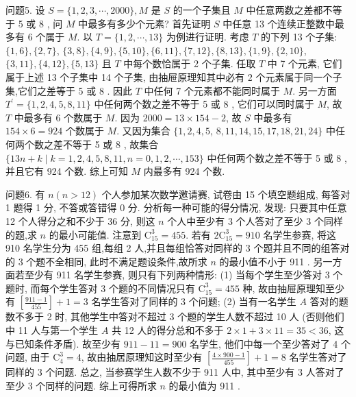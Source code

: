问题5. 设 $S=\{1,2,3, \cdots, 2000\}, M$ 是 $S$ 的一个子集且 $M$ 中任意两数之差都不等于 5 或 8 , 问 $M$ 中最多有多少个元素?
首先证明 $S$ 中任意 13 个连续正整数中最多有 6 个属于 $M$. 以 $T= \{1,2, \cdots, 13\}$ 为例进行证明.
考虑 $T$ 的下列 13 个子集: $\{1,6\},\{2,7\}$, $\{3,8\},\{4,9\},\{5,10\},\{6,11\},\{7,12\},\{8,13\},\{1,9\},\{2,10\}$, $\{3,11\},\{4,12\},\{5,13\}$ 且 $T$ 中每个数恰属于 2 个子集.
任取 $T$ 中 7 个元素, 它们属于上述 13 个子集中 14 个子集, 由抽屉原理知其中必有 2 个元素属于同一个子集,它们之差等于 5 或 8 . 因此 $T$ 中任何 7 个元素都不能同时属于 $M$. 另一方面 $T^{\prime}=\{1,2,4,5,8,11\}$ 中任何两个数之差不等于 5 或 8 , 它们可以同时属于 $M$, 故 $T$ 中最多有 6 个数属于 $M$. 因为 $2000=13 \times 154-2$, 故 $S$ 中最多有 $154 \times 6=924$ 个数属于 $M$. 又因为集合 $\{1,2,4,5$, $8,11,14,15,17,18,21,24\}$ 中任何两个数之差不等于 5 或 8 , 故集合 $\{13 n+k \mid k=1,2,4,5,8,11, n=0,1,2, \cdots, 153\}$ 中任何两个数之差不等于 5 或 8 ,并且它有 924 个数.
综上可知 $M$ 内最多有 924 个数.



问题6. 有 $n(n>12)$ 个人参加某次数学邀请赛, 试卷由 15 个填空题组成, 每答对 1 题得 1 分, 不答或答错得 0 分.
分析每一种可能的得分情况, 发现: 只要其中任意 12 个人得分之和不少于 36 分, 则这 $n$ 个人中至少有 3 个人答对了至少 3 个同样的题,求 $n$ 的最小可能值.
注意到 $\mathrm{C}_{15}^3=455$. 若有 $2 \mathrm{C}_{15}^3=910$ 名学生参赛, 将这 910 名学生分为 455 组,每组 2 人,并且每组恰答对同样的 3 个题并且不同的组答对的 3 个题不全相同, 此时不满足题设条件,故所求 $n$ 的最小值不小于 911 . 另一方面若至少有 911 名学生参赛, 则只有下列两种情形: (1) 当每个学生至少答对 3 个题时, 而每个学生答对 3 个题的不同情况只有 $\mathrm{C}_{15}^3=455$ 种, 故由抽屉原理知至少有 $\left[\frac{911-1}{455}\right]+1=3$ 名学生答对了同样的 3 个问题; (2) 当有一名学生 $A$ 答对的题数不多于 2 时, 其他学生中答对不超过 3 个题的学生人数不超过 10 人 (否则他们中 11 人与第一个学生 $A$ 共 12 人的得分总和不多于 $2 \times 1+3 \times 11=35<36$, 这与已知条件矛盾). 故至少有 $911-11=900$ 名学生, 他们中每一个至少答对了 4 个问题, 由于 $\mathrm{C}_4^3=4$, 故由抽居原理知这时至少有 $\left[\frac{4 \times 900-1}{455}\right]+1=8$ 名学生答对了同样的 3 个问题.
总之, 当参赛学生人数不少于 911 人中, 其中至少有 3 人答对了至少 3 个同样的问题.
综上可得所求 $n$ 的最小值为 911 .



